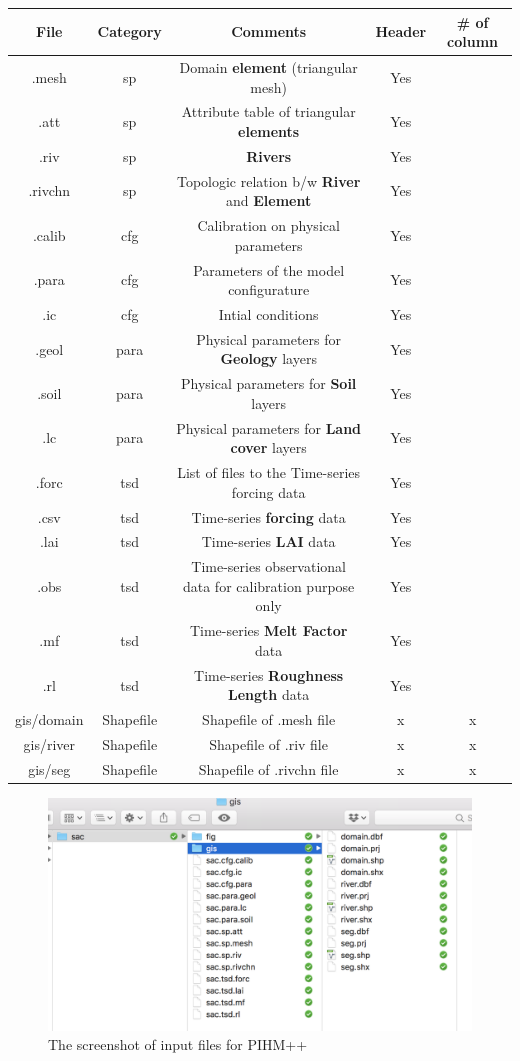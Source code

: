\documentclass[]{scrbook}
\begin{document}
\begin{longtable}[]{@{}ccccc@{}}
\toprule
File & Category & Comments & Header & \# of column\tabularnewline
\midrule
\endhead
.mesh & sp & Domain \textbf{element} (triangular mesh) & Yes
&\tabularnewline
.att & sp & Attribute table of triangular \textbf{elements} & Yes
&\tabularnewline
.riv & sp & \textbf{Rivers} & Yes &\tabularnewline
.rivchn & sp & Topologic relation b/w \textbf{River} and
\textbf{Element} & Yes &\tabularnewline
.calib & cfg & Calibration on physical parameters & Yes &\tabularnewline
.para & cfg & Parameters of the model configurature & Yes
&\tabularnewline
.ic & cfg & Intial conditions & Yes &\tabularnewline
.geol & para & Physical parameters for \textbf{Geology} layers & Yes
&\tabularnewline
.soil & para & Physical parameters for \textbf{Soil} layers & Yes
&\tabularnewline
.lc & para & Physical parameters for \textbf{Land cover} layers & Yes
&\tabularnewline
.forc & tsd & List of files to the Time-series forcing data & Yes
&\tabularnewline
.csv & tsd & Time-series \textbf{forcing} data & Yes &\tabularnewline
.lai & tsd & Time-series \textbf{LAI} data & Yes &\tabularnewline
.obs & tsd & Time-series observational data for calibration purpose only
& Yes &\tabularnewline
.mf & tsd & Time-series \textbf{Melt Factor} data & Yes &\tabularnewline
.rl & tsd & Time-series \textbf{Roughness Length} data & Yes
&\tabularnewline
gis/domain & Shapefile & Shapefile of .mesh file & x & x\tabularnewline
gis/river & Shapefile & Shapefile of .riv file & x & x\tabularnewline
gis/seg & Shapefile & Shapefile of .rivchn file & x & x\tabularnewline
\bottomrule
\end{longtable}

\begin{figure}
\centering
\includegraphics{Fig/IO/Inputfiles.png}
\caption{The screenshot of input files for PIHM++}
\end{figure}
\end{document}
